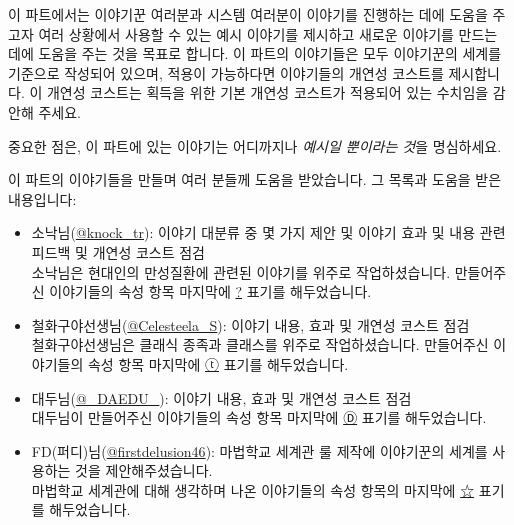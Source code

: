 \documentclass{report}
\begin{document}
	이 파트에서는 이야기꾼 여러분과 시스템 여러분이 이야기를 진행하는 데에 도움을 주고자 여러 상황에서 사용할 수 있는 예시 이야기를 제시하고 새로운 이야기를 만드는 데에 도움을 주는 것을 목표로 합니다. 이 파트의 이야기들은 모두 이야기꾼의 세계를 기준으로 작성되어 있으며, 적용이 가능하다면 이야기들의 개연성 코스트를 제시합니다. 이 개연성 코스트는 획득을 위한 기본 개연성 코스트가 적용되어 있는 수치임을 감안해 주세요.
	
	중요한 점은, 이 파트에 있는 이야기는 어디까지나 \emph{예시일 뿐이라는 것}을 명심하세요.
	
	이 파트의 이야기들을 만들며 여러 분들께 도움을 받았습니다. 그 목록과 도움을 받은 내용입니다:
	\begin{itemize}
		\item \hypertarget{knock}{}소낙님(\href{https://twitter.com/knock_tr}{@knock\_tr}): 이야기 대분류 중 몇 가지 제안 및 이야기 효과 및 내용 관련 피드백 및 개연성 코스트 점검\\
		소낙님은 현대인의 만성질환에 관련된 이야기를 위주로 작업하셨습니다. 만들어주신 이야기들의 속성 항목 마지막에 \hyperlink{knock}{?} 표기를 해두었습니다.
		
		\item \hypertarget{celesteela}{}철화구야선생님(\href{https://twitter.com/Celesteela_S}{@Celesteela\_S}): 이야기 내용, 효과 및 개연성 코스트 점검\\
		철화구야선생님은 클래식 종족과 클래스를 위주로 작업하셨습니다. 만들어주신 이야기들의 속성 항목 마지막에 \hyperlink{celesteela}{ⓣ} 표기를 해두었습니다.
		
		\item \hypertarget{daedu}{}대두님(\href{https://twitter.com/_DAEDU_}{@\_DAEDU\_}): 이야기 내용, 효과 및 개연성 코스트 점검\\
		대두님이 만들어주신 이야기들의 속성 항목 마지막에 \hyperlink{daedu}{Ⓓ}  표기를 해두었습니다.
		
		\item \hypertarget{fd46}{}FD(퍼디)님(\href{https://twitter.com/firstdelusion46}{@firstdelusion46}): 마법학교 세계관 룰 제작에 이야기꾼의 세계를 사용하는 것을 제안해주셨습니다.\\
		마법학교 세계관에 대해 생각하며 나온 이야기들의 속성 항목의 마지막에 \hyperlink{fd46}{☆} 표기를 해두었습니다.
	\end{itemize}
\end{document}
